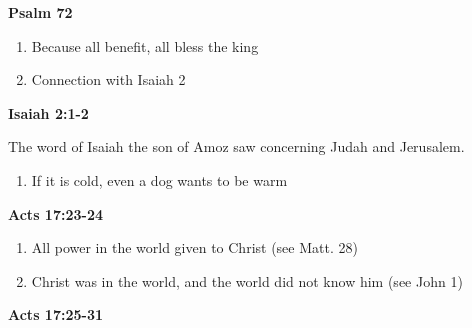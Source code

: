 \documentclass[dark]{gsf-presentation}
\begin{document}
\begin{frame}[plain]{\textbf{\textcolor{SecondColor}{\LARGE Psalm 72}}}
	\LARGE
	\begin{center}

	\end{center}
\end{frame}

\begin{frame}
	\LARGE
	\begin{enumerate}
		\item Because all benefit, all bless the king
		\item Connection with Isaiah 2
	\end{enumerate}
\end{frame}

\begin{frame}[plain]{\textbf{\textcolor{SecondColor}{\LARGE Isaiah 2:1-2}}}
	\LARGE
	\begin{center}
		The word of Isaiah the son of Amoz saw concerning
		Judah and Jerusalem.

		\vspace{2mm}

	\end{center}
\end{frame}

\begin{frame}
	\LARGE
	\begin{enumerate}
		\item If it is cold, even a dog wants to be warm
	\end{enumerate}
\end{frame}

\begin{frame}[plain]{\textbf{\textcolor{SecondColor}{\LARGE Acts 17:23-24}}}
	\LARGE
	\begin{center}

	\end{center}
\end{frame}

\begin{frame}
	\begin{enumerate}
		\item All power in the world given to Christ (see Matt. 28)
		\item Christ was in the world, and the world did
			not know him (see John 1)
	\end{enumerate}
\end{frame}

\begin{frame}[plain]{\textbf{\textcolor{SecondColor}{\LARGE Acts 17:25-31}}}
	\LARGE
	\begin{center}

	\end{center}
\end{frame}
\end{document}

